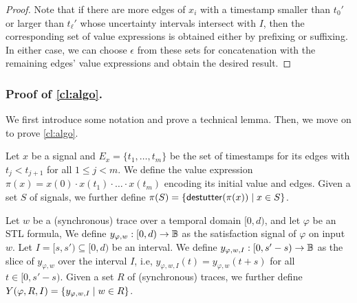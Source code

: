 \begin{proof}
	Note that if there are more edges of $x_i$ with a timestamp smaller than $t_0'$ or larger than $t_\ell'$ whose uncertainty intervals intersect with $I$, then the corresponding set of value expressions is obtained either by prefixing or suffixing.
	In either case, we can choose $\epsilon$ from these sets for concatenation with the remaining edges' value expressions and obtain the desired result.
%	
\end{proof}

\subsubsection{Proof of \cref{cl:algo}.}

We first introduce some notation and prove a technical lemma.
Then, we move on to prove \cref{cl:algo}. 

Let $x$ be a signal and $E_x = \{t_1, \ldots, t_m\}$ be the set of timestamps for its edges with $t_j < t_{j+1}$ for all $1 \leq j < m$.
We define the value expression $\pi(x) = x(0) \cdot x(t_1) \cdot \ldots \cdot x(t_m)$ encoding its initial value and edges.
Given a set $S$ of signals, we further define $\pi(S) = \{ \destutter(\pi(x)) \st x \in S \}$.

Let $w$ be a (synchronous) trace over a temporal domain $[0,d)$, and let $\varphi$ be an STL formula,
We define $y_{\varphi,w} : [0,d) \to \mathbb{B}$ as the satisfaction signal of $\varphi$ on input $w$.
Let $I = [s, s') \subseteq [0,d)$ be an interval.
We define $y_{\varphi,w,I} : [0, s' - s) \to \mathbb{B}$ as the slice of $y_{\varphi,w}$ over the interval $I$, i.e, $y_{\varphi,w,I}(t) = y_{\varphi,w}(t + s)$ for all $t \in [0, s' - s)$.
Given a set  $R$ of (synchronous) traces, we further define $Y(\varphi, R, I) = \{ y_{\varphi,w,I} \st w \in R \}$.

